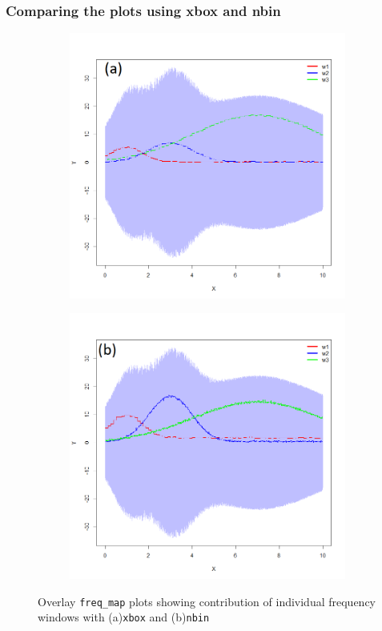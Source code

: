 \documentclass{article}
\begin{document}
\subsubsection{Comparing the plots using xbox and nbin}
 \begin{figure}[h]
	\centering
	\begin{subfigure}[t]{0.49\textwidth}
		\centering
		\includegraphics[width=\linewidth]{signal_build1_freqMap_xbox.png}
		\label{F2a}
	\end{subfigure}
	\hfill
	\begin{subfigure}[t]{0.49\textwidth}
		\centering
		\includegraphics[width=\linewidth]{signal_build2_freqMap_nbin.png}
		\label{F2b}
	\end{subfigure}
	\caption{Overlay \lstinline[language=R]|freq_map| plots showing contribution of individual frequency windows with (a)\lstinline[language=R]|xbox| and (b)\lstinline[language=R]|nbin| }\label{F2}
\end{figure}
\end{document}
